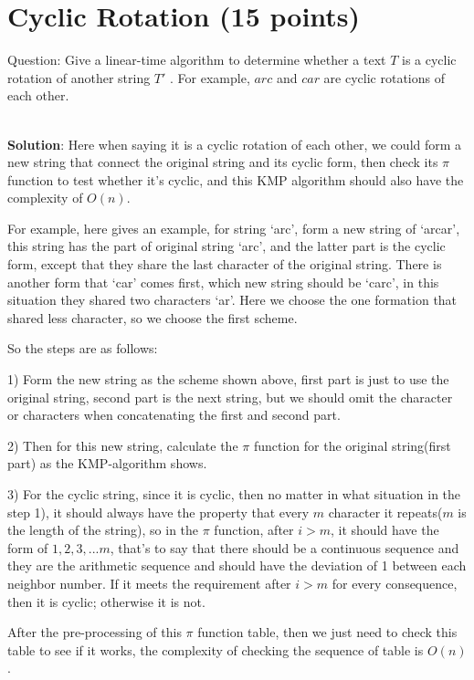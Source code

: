 \documentclass{article}
\begin{document}
\section{Cyclic Rotation (15 points)}
Question: Give a linear-time algorithm to determine whether a text $T$ is a cyclic rotation of another string $T'$ . For example, $arc$ and $car$ are cyclic rotations of each other.

~\\
\textbf{Solution}:\newline
\indent Here when saying it is a cyclic rotation of each other, we could form a new string that connect the original string and its cyclic form, then check its $\pi$ function to test whether it's cyclic, and this KMP algorithm should also have the complexity of $O(n)$.

For example, here gives an example, for string `arc', form a new string of `arcar', this string has the part of original string `arc', and the latter part is the cyclic form, except that they share the last character of the original string. There is another form that `car' comes first, which new string should be `carc', in this situation they shared two characters `ar'. Here we choose the one formation that shared less character, so we choose the first scheme.

So the steps are as follows:

1) Form the new string as the scheme shown above, first part is just to use the original string, second part is the next string, but we should omit the character or characters when concatenating the first and second part.

2) Then for this new string, calculate the $\pi$ function for the original string(first part) as the KMP-algorithm shows.

3) For the cyclic string, since it is cyclic, then no matter in what situation in the step 1), it should always have the property that every $m$ character it repeats($m$ is the length of the string), so in the $\pi$ function, after $i > m$, it should have the form of $1, 2, 3, ... m$, that's to say that there should be a continuous sequence and they are the arithmetic sequence and should have the deviation of 1 between each neighbor number. If it meets the requirement after $i > m$ for every consequence, then it is cyclic; otherwise it is not.

After the pre-processing of this $\pi$ function table, then we just need to check this table to see if it works, the complexity of checking the sequence of table is $O(n)$.
\end{document}
